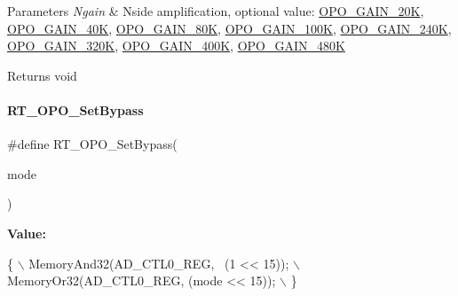\begin{DoxyParams}{Parameters}
{\em Ngain} & Nside amplification, optional value\+: \mbox{\hyperlink{a00002_a6424f6db97a2e691b73af9c4053f1650a44bf632448f2bed40aad8456d4ab211e}{O\+P\+O\+\_\+\+G\+A\+I\+N\+\_\+20K}}, \mbox{\hyperlink{a00002_a6424f6db97a2e691b73af9c4053f1650adbde1c86d4a091e298c72418f7ccf5eb}{O\+P\+O\+\_\+\+G\+A\+I\+N\+\_\+40K}}, \mbox{\hyperlink{a00002_a6424f6db97a2e691b73af9c4053f1650a42eb5c59d1b93acc89ceb144bbe3fca0}{O\+P\+O\+\_\+\+G\+A\+I\+N\+\_\+80K}}, \mbox{\hyperlink{a00002_a6424f6db97a2e691b73af9c4053f1650a1f2a22a037ee965a0b37a2f5c3eed0bc}{O\+P\+O\+\_\+\+G\+A\+I\+N\+\_\+100K}}, \mbox{\hyperlink{a00002_a6424f6db97a2e691b73af9c4053f1650ad9ddaa398b63e426eb6f7d6c721aa2af}{O\+P\+O\+\_\+\+G\+A\+I\+N\+\_\+240K}}, \mbox{\hyperlink{a00002_a6424f6db97a2e691b73af9c4053f1650afd00b530e99b17ea02716d355ecdd695}{O\+P\+O\+\_\+\+G\+A\+I\+N\+\_\+320K}}, \mbox{\hyperlink{a00002_a6424f6db97a2e691b73af9c4053f1650ab647d5f1f3b13168dca7f204c08021a8}{O\+P\+O\+\_\+\+G\+A\+I\+N\+\_\+400K}}, \mbox{\hyperlink{a00002_a6424f6db97a2e691b73af9c4053f1650a2b7df29c5ca03fcca36f648dbd2dc95b}{O\+P\+O\+\_\+\+G\+A\+I\+N\+\_\+480K}} \\
\hline
\end{DoxyParams}
\begin{DoxyReturn}{Returns}
void 
\end{DoxyReturn}
\mbox{\label{a00002_a3297280ab870eae12b918351e111819a}} 
\paragraph{\texorpdfstring{R\+T\+\_\+\+O\+P\+O\+\_\+\+Set\+Bypass}{RT\_OPO\_SetBypass}}
{\footnotesize\ttfamily \#define R\+T\+\_\+\+O\+P\+O\+\_\+\+Set\+Bypass(\begin{DoxyParamCaption}\item[{}]{mode }\end{DoxyParamCaption})}

{\bfseries Value\+:}
\begin{DoxyCode}
\{                                           \(\backslash\)
        MemoryAnd32(AD\_CTL0\_REG, ~(1 << 15));   \(\backslash\)
        MemoryOr32(AD\_CTL0\_REG, (mode << 15));  \(\backslash\)
    \}
\end{DoxyCode}


